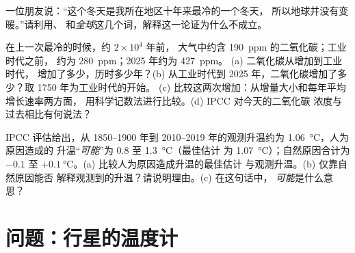 \begin{exercise}[$\star\star$]\label{exo:g9:climate-past-and-present:10}
一位朋友说：“这个冬天是我所在地区十年来最冷的一个冬天，
所以地球并没有变暖。”请利用\emph{}、
\emph{}和\emph{全球}这几个词，解释这一论证为什么不成立。
\end{exercise}

\begin{exercise}[$\star\star\star$]\label{exo:g9:climate-past-and-present:11}
在上一次最冷的时候，约 $2 \times 10^4$ 年前，
大气中约含 \qty{190}{ppm} 的二氧化碳；工业时代之前，
约为 \qty{280}{ppm}；2025 年约为 \qty{427}{ppm}。
(a) 二氧化碳从增加到工业时代，
增加了多少，历时多少年？(b) 从工业时代到
2025 年，二氧化碳增加了多少？取 1750 年为工业时代的开始。
(c) 比较这两次增加：从增量大小和每年平均增长速率两方面，
用科学记数法进行比较。(d) IPCC 对今天的二氧化碳
浓度与过去相比有何说法？
\end{exercise}

\begin{exercise}[$\star\star\star$]\label{exo:g9:climate-past-and-present:12}
IPCC 评估给出，从 1850--1900 年到
2010--2019 年的观测升温约为 \qty{1.06}{\degreeCelsius}，人为原因造成的
升温“\emph{可能}”为 0.8 至 \qty{1.3}{\degreeCelsius}（最佳估计
为 \qty{1.07}{\degreeCelsius}）；自然原因合计为
$-0.1$ 至 $+\qty{0.1}{\degreeCelsius}$。(a) 比较人为原因造成升温的最佳估计
与观测升温。(b) 仅靠自然原因能否
解释观测到的升温？请说明理由。(c) 在这句话中，
\emph{可能}是什么意思？
\end{exercise}

\section{问题：行星的温度计}

